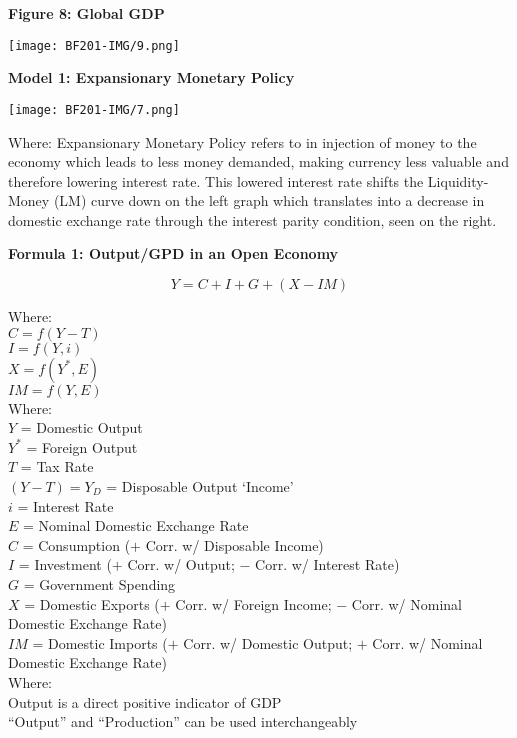 \documentclass[11pt, english]{article}
\begin{document}
        \textbf{Figure 8: Global GDP}

        \begin{center}
                \texttt{[image: BF201-IMG/9.png]}
        \end{center}

	\textbf{Model 1: Expansionary Monetary Policy}

	\begin{center}
		\texttt{[image: BF201-IMG/7.png]}
	\end{center}

	Where: Expansionary Monetary Policy refers to in injection of money to the economy which leads to less money demanded, making currency less valuable and therefore lowering interest rate. This lowered interest rate shifts the Liquidity-Money (LM) curve down on the left graph which translates into a decrease in domestic exchange rate through the interest parity condition, seen on the right.

	\textbf{Formula 1: Output/GPD in an Open Economy}

	$$Y=C+I+G+(X-IM)$$

	Where:\\
	$C=f(Y-T)$\\
	$I=f(Y,i)$\\
	$X=f(Y^*,E)$\\
	$IM=f(Y,E)$\\

	Where:\\
	$Y$ = Domestic Output\\
	$Y^*$ = Foreign Output\\
	$T$ = Tax Rate\\
	$(Y-T)=Y_D$ = Disposable Output `Income'\\
	$i$ = Interest Rate\\
	$E$ = Nominal Domestic Exchange Rate\\
	$C$ = Consumption ($+$ Corr. w/ Disposable Income)\\
	$I$ = Investment ($+$ Corr. w/ Output; $-$ Corr. w/ Interest Rate)\\
	$G$ = Government Spending\\
	$X$ = Domestic Exports ($+$ Corr. w/ Foreign Income; $-$ Corr. w/ Nominal Domestic Exchange Rate)\\
	$IM$ = Domestic Imports ($+$ Corr. w/ Domestic Output; $+$ Corr. w/ Nominal Domestic Exchange Rate)\\

	Where:\\
	Output is a direct positive indicator of GDP\\
	``Output'' and ``Production'' can be used interchangeably\\
\end{document}
